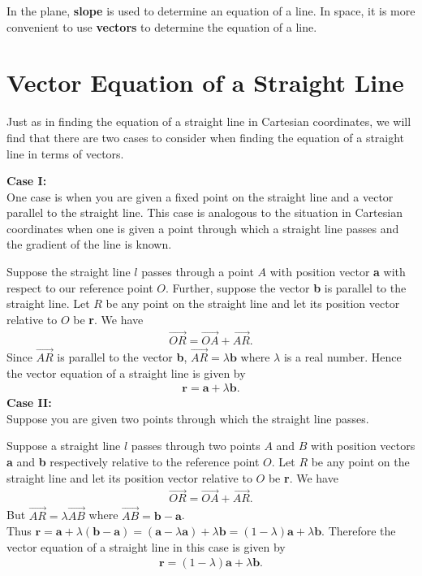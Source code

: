 \documentclass[titlepage,a4paper,12pt]{report}
\begin{document}
In the plane, \textbf{slope} is used to determine an equation of a line. In space, it is more convenient to use \textbf{vectors} to determine the equation of a line.
\section{Vector Equation of a Straight Line}
Just as in finding the equation of a straight line in Cartesian coordinates, we will find that there are two cases to consider when finding the equation of a straight line in terms of vectors.

\noindent\textbf{Case I:}\\
One case is when you are given a fixed point on the straight line and a vector parallel to the straight line. This case is analogous to the situation in Cartesian coordinates when one is given a point through which a straight line passes and the gradient of the line is known.

\noindent Suppose the straight line $l$ passes through a point $A$ with position vector \textbf{a} with respect to our reference point $O$. Further, suppose the vector \textbf{b} is parallel to the straight line. Let $R$ be any point on the straight line and let its position vector relative to $O$ be \textbf{r}. We have \begin{eqnarray}
\overrightarrow{OR}=\overrightarrow{OA}+\overrightarrow{AR}.\nonumber
\end{eqnarray} Since $\overrightarrow{AR}$ is parallel to the vector \textbf{b}, $\overrightarrow{AR}=\lambda\textbf{b}$ where $\lambda$ is a real number. Hence the vector equation of a straight line is given by\begin{eqnarray}\label{vc1}
\textbf{r}=\textbf{a}+\lambda\textbf{b}.
\end{eqnarray}
\noindent\textbf{Case II:}\\
Suppose you are given two points through which the straight line passes.

\noindent Suppose a straight line $l$ passes through two points $A$ and $B$ with position vectors \textbf{a} and \textbf{b} respectively relative to the reference point $O$. Let $R$ be any point on the straight line and let its position vector relative to $O$ be \textbf{r}. We have \begin{eqnarray}
\overrightarrow{OR}=\overrightarrow{OA}+\overrightarrow{AR}. \nonumber
\end{eqnarray}But $\overrightarrow{AR}=\lambda\overrightarrow{AB}$ where $\overrightarrow{AB}=\textbf{b}-\textbf{a}$.\\
Thus $\textbf{r}=\textbf{a}+\lambda(\textbf{b}-\textbf{a})=(\textbf{a}-\lambda\textbf{a})+\lambda\textbf{b}=(1-\lambda)\textbf{a}+\lambda\textbf{b}$. Therefore the vector equation of a straight line in this case is given by \begin{eqnarray}\label{vc2}
\textbf{r}=(1-\lambda)\textbf{a}+\lambda\textbf{b}.
\end{eqnarray}
\end{document}
